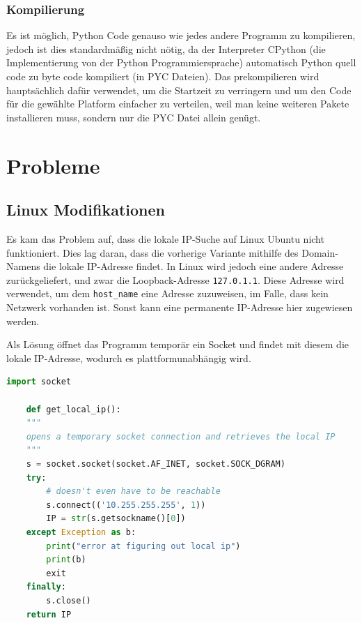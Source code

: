 \subsubsection{Kompilierung}
Es ist möglich, Python Code genauso wie jedes andere Programm zu kompilieren,
jedoch ist dies standardmäßig nicht nötig, 
da der Interpreter CPython (die Implementierung von der Python Programmiersprache) 
automatisch Python quell code zu byte code kompiliert (in PYC Dateien).
Das prekompilieren wird hauptsächlich dafür verwendet, 
um die Startzeit zu verringern 
und um den Code für die gewählte Platform einfacher zu verteilen,
weil man keine weiteren Pakete installieren muss, 
sondern nur die PYC Datei allein genügt.


\section{Probleme}
\subsection{Linux Modifikationen}
Es kam das Problem auf, 
dass die lokale IP-Suche auf Linux Ubuntu nicht funktioniert.
Dies lag daran, 
dass die vorherige Variante mithilfe des Domain-Namens die lokale IP-Adresse findet.
In Linux wird jedoch eine andere Adresse zurückgeliefert, 
und zwar die Loopback-Adresse \texttt{127.0.1.1}. 
Diese Adresse wird verwendet, um dem \texttt{host\_name} eine Adresse zuzuweisen,
im Falle, dass kein Netzwerk vorhanden ist. 
Sonst kann eine permanente IP-Adresse hier zugewiesen werden.

Als Lösung öffnet das Programm temporär ein Socket 
und findet mit diesem die lokale IP-Adresse, wodurch es plattformunabhängig wird.
\begin{lstlisting}[language=python, gobble=4]
    import socket

    def get_local_ip():
    """
    opens a temporary socket connection and retrieves the local IP
    """
    s = socket.socket(socket.AF_INET, socket.SOCK_DGRAM)
    try:
        # doesn't even have to be reachable
        s.connect(('10.255.255.255', 1))
        IP = str(s.getsockname()[0])
    except Exception as b:
        print("error at figuring out local ip")
        print(b)
        exit
    finally:
        s.close()
    return IP
\end{lstlisting}

